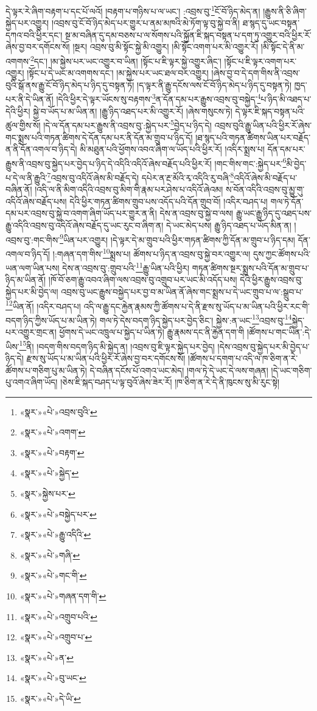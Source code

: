 དེ་ལྟར་རེ་ཞིག་བརྟག་པ་དང་པོ་ལའོ། །བརྟག་པ་གཉིས་པ་ལ་ཡང་། :འབྲས་བུ་\footnote{«སྣར་»«པེ་»འབྲས་བུའི་}ངོ་བོ་ཉིད་མེད་ན། །རྒྱུས་ནི་ཅི་ཞིག་སྐྱེད་པར་འགྱུར། །འབྲས་བུ་ངོ་བོ་ཉིད་མེད་པར་གྱུར་པ་ནམ་མཁའི་མེ་ཏོག་ལྟ་བུ་སྐྱེ་བ་ནི། ཐ་སྙད་དུ་ཡང་བསྟན་དཀའ་བའི་ཕྱིར་དང་། སྔ་མ་བཞིན་དུ་དམ་བཅས་པ་ལ་སོགས་པའི་སྐྱོན་ཇི་སྐད་བསྟན་པ་དག་ཏུ་འགྱུར་བའི་ཕྱིར་རོ་ཞེས་བྱ་བར་དགོངས་སོ། །སྔར། འབྲས་བུ་མི་སྟོང་སྐྱེ་མི་འགྱུར། །མི་སྟོང་འགག་པར་མི་འགྱུར་རོ། །མི་སྟོང་དེ་ནི་མ་འགགས་\footnote{«སྣར་»«པེ་»འགག་}དང་། །མ་སྐྱེས་པར་ཡང་འགྱུར་བ་ཡིན། །སྟོང་པ་ཇི་ལྟར་སྐྱེ་འགྱུར་ཞིང་། །སྟོང་པ་ཇི་ལྟར་འགག་པར་འགྱུར། །སྟོང་པ་དེ་ཡང་མ་འགགས་དང་། །མ་སྐྱེས་པར་ཡང་ཐལ་བར་འགྱུར། །ཞེས་བྱ་བ་དེ་དག་གིས་ནི་འབྲས་བུའི་སྒོ་ནས་རྒྱུ་ངོ་བོ་ཉིད་མེད་པ་ཉིད་དུ་བསྟན་ཏོ། །ད་ལྟར་ནི་རྒྱུ་དངོས་ལས་ངོ་བོ་ཉིད་མེད་པ་ཉིད་དུ་བསྟན་ཏེ། ཁྱད་པར་ནི་དེ་ཡིན་ནོ། །དེའི་ཕྱིར་དེ་ལྟར་ཡོངས་སུ་བརྟགས་\footnote{«སྣར་»«པེ་»བརྟག་}ན་དོན་དམ་པར་རྒྱུས་འབྲས་བུ་བསྐྱེད་\footnote{«སྣར་»«པེ་»སྐྱེད་}པ་ཉིད་མི་འཐད་པ་དེའི་ཕྱིར། སྐྱེ་བ་ཡོད་པ་མ་ཡིན་ན། །རྒྱུ་ཉིད་འཐད་པར་མི་འགྱུར་རོ། །ཞེས་གསུངས་ཏེ། དེ་ལྟར་ཇི་སྐད་བསྟན་པའི་ཚུལ་གྱིས་སོ། །དེ་ལ་དོན་དམ་པར་རྒྱུས་ནི་འབྲས་བུ་:སྐྱེད་པར་\footnote{«སྣར་»སྐྱེས་པར་}བྱེད་པ་ཉིད་དེ། འབྲས་བུའི་རྒྱུ་ཡིན་པའི་ཕྱིར་རོ་ཞེས་གང་སྨྲས་པའི་གཏན་ཚིགས་དེ་དོན་དམ་པར་ནི་དོན་མ་གྲུབ་པ་ཉིད་དོ། །ཐ་སྙད་པའི་གཏན་ཚིགས་ཡིན་པར་བརྗོད་ན་ནི་དོན་འགལ་བ་ཉིད་དེ། མི་མཐུན་པའི་ཕྱོགས་འབའ་ཞིག་ལ་ཡོད་པའི་ཕྱིར་རོ། །འདིར་སྨྲས་པ། དོན་དམ་པར་རྒྱུས་ནི་འབྲས་བུ་སྐྱེད་པར་བྱེད་པ་ཉིད་དེ་འདིའི་འདིའོ་ཞེས་བརྗོད་པའི་ཕྱིར་རོ། །གང་གིས་གང་:སྐྱེད་པར་\footnote{«སྣར་»«པེ་»བསྐྱེད་པར་}མི་བྱེད་པ་དེ་ལ་ནི་རྒྱུའི་\footnote{«སྣར་»«པེ་»རྒྱུ་འདིའི་}འབྲས་བུ་འདིའོ་ཞེས་མི་བརྗོད་དེ། དཔེར་ན་རྔ་མོའི་རྭ་འདིའི་རུ་བཞི་\footnote{«སྣར་»«པེ་»གཞི་}འདིའོ་ཞེས་མི་བརྗོད་པ་བཞིན་ནོ། །འདི་ལ་ནི་མིག་འདིའི་འབྲས་བུ་མིག་གི་རྣམ་པར་ཤེས་པ་འདིའོ་ཞེའམ། ས་བོན་འདིའི་འབྲས་བུ་མྱུ་གུ་འདིའོ་ཞེས་བརྗོད་པས། དེའི་ཕྱིར་གཏན་ཚིགས་གྲུབ་པས་འདོད་པའི་དོན་གྲུབ་བོ། །འདིར་བཤད་པ། གལ་ཏེ་དོན་དམ་པར་འབྲས་བུ་སྐྱེ་བ་འགག་ཞིག་ཡོད་པར་གྱུར་ན་ནི། དེས་ན་འབྲས་བུ་སྐྱེ་བ་ལས། རྒྱུ་ཡང་རྒྱུ་ཉིད་དུ་འཐད་པས་རྒྱུ་འདིའི་འབྲས་བུ་འདིའོ་ཞེས་བརྗོད་དུ་ཡང་རུང་བ་ཞིག་ན། དེ་ཡང་མེད་པས། རྒྱུ་ཉིད་འཐད་པ་ཡོད་མིན་ན། །འབྲས་བུ་:གང་གིས་\footnote{«སྣར་»«པེ་»གང་གི་}ཡིན་པར་འགྱུར། །དེ་ལྟར་དེ་མ་གྲུབ་པའི་ཕྱིར་གཏན་ཚིགས་ཀྱི་དོན་མ་གྲུབ་པ་ཉིད་དམ། དོན་འགལ་བ་ཉིད་དོ། །:གཞན་དག་གིས་\footnote{«སྣར་»«པེ་»གཞན་དག་གི་}སྨྲས་པ། ཚོགས་པ་ཉིད་ན་འབྲས་བུ་སྐྱེ་བར་འགྱུར་ལ། དུས་ཀྱང་ཚོགས་པའི་ཡན་ལག་ཡིན་པས། དེས་ན་འབྲས་བུ་:གྲུབ་པའི་\footnote{«སྣར་»«པེ་»འགྲུབ་པའི་}རྒྱུ་ཡིན་པའི་ཕྱིར། གཏན་ཚིགས་སྔར་སྨྲས་པའི་དོན་མ་གྲུབ་པ་ཉིད་མ་ཡིན་ནོ། །ཁོ་བོ་ཅག་རྒྱུ་འབའ་ཞིག་ལས་འབྲས་བུ་འགྲུབ་པར་ཡང་མི་འདོད་པས། དེའི་ཕྱིར་རྒྱུས་འབྲས་བུ་སྐྱེད་པར་མི་བྱེད་ལ། འབྲས་བུ་ཡང་རྒྱུས་བསྐྱེད་པར་བྱ་བ་མ་ཡིན་ནོ་ཞེས་གང་སྨྲས་པ་དེ་ཡང་གྲུབ་པ་ལ་:སྒྲུབ་པ་\footnote{«སྣར་»«པེ་»འགྲུབ་པ་}ཡིན་ནོ། །འདིར་བཤད་པ། འདི་ལ་རྒྱུ་དང་རྐྱེན་རྣམས་ཀྱི་ཚོགས་པ་དེ་ནི་རྫས་སུ་ཡོད་པ་མ་ཡིན་པའི་ཕྱིར་རང་གི་བདག་ཉིད་ཀྱིས་ཡོད་པ་མ་ཡིན་ཏེ། གལ་ཏེ་དེས་བདག་ཉིད་སྐྱེད་པར་བྱེད་ཅིང་། སྐྱེས་:ན་ཡང་\footnote{«སྣར་»«པེ་»ན་}འབྲས་བུ་\footnote{«སྣར་»«པེ་»བུ་ཡང་}སྐྱེད་པར་འགྱུར་གྲང་ན། ཕྱོགས་དེ་ཡང་འཁྲུལ་པ་སྐྱེད་པ་ཡིན་ཏེ། རྒྱུ་རྣམས་དང་ནི་རྐྱེན་དག་གི །ཚོགས་པ་གང་ཡིན་:དེ་ཡིས་\footnote{«སྣར་»«པེ་»དེ་ཡི་}ནི། །བདག་གིས་བདག་ཉིད་མི་སྐྱེད་ན། །འབྲས་བུ་ཇི་ལྟར་སྐྱེད་པར་བྱེད། །དེས་འབྲས་བུ་སྐྱེད་པར་མི་བྱེད་པ་ཉིད་དེ། རྫས་སུ་ཡོད་པ་མ་ཡིན་པའི་ཕྱིར་རོ་ཞེས་བྱ་བར་དགོངས་སོ། །ཚོགས་པ་དགག་པ་འདི་ལ་ཁ་ཅིག་ན་རེ་ཚོགས་པ་གཅིག་པུ་མ་ཡིན་ཏེ། དེ་བཞིན་དངོས་པོ་འགའ་ཡང་མེད། །གལ་ཏེ་དེ་ཡང་དེ་ལས་གཞན། །དེ་ཡང་གཅིག་པུ་འགའ་ཞིག་ཡོད། །ཅེས་ཇི་སྐད་བཤད་པ་ལྟ་བུའོ་ཞེས་ཟེར་རོ། །ཁ་ཅིག་ན་རེ་དེ་ནི་ཁུངས་སུ་མི་རུང་སྟེ། 